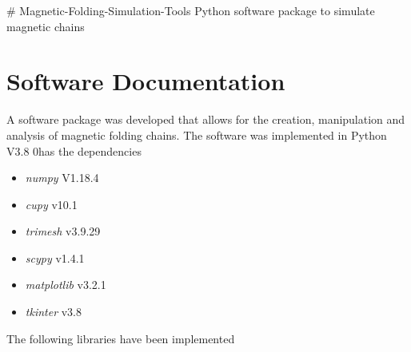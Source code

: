 # Magnetic-Folding-Simulation-Tools
Python software package to simulate magnetic chains


\section{Software Documentation}
\label{ap:soft_doku}
A software package was developed that allows for the creation, manipulation and analysis of magnetic folding chains. The software was implemented in Python V3.8 0has the dependencies
\begin{itemize}
    \item \textit{numpy} V1.18.4
    \item \textit{cupy} v10.1
    \item \textit{trimesh} v3.9.29
    \item \textit{scypy} v1.4.1
    \item \textit{matplotlib} v3.2.1
    \item \textit{tkinter} v3.8
\end{itemize}
The following libraries have been implemented
